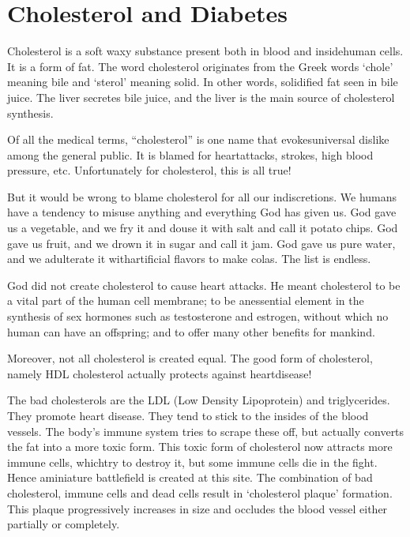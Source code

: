 \chapter{Cholesterol and Diabetes}\label{chap13B}

Cholesterol is a soft waxy substance present both in blood and inside\break human cells. It is a form of fat. The word cholesterol originates from the Greek words ‘chole’ meaning bile and ‘sterol’ meaning solid. In other words, solidified fat seen in bile juice. The liver secretes bile juice, and the liver is the main source of cholesterol synthesis.

Of all the medical terms, “cholesterol” is one name that evokes\break universal dislike among the general public. It is blamed for heart\break attacks, strokes, high blood pressure, etc. Unfortunately for choleste\-rol, this is all true!

But it would be wrong to blame cholesterol for all our indiscretions. We humans have a tendency to misuse anything and everything God has given us. God gave us a vegetable, and we fry it and douse it with salt and call it potato chips. God gave us fruit, and we drown it in sugar and call it jam. God gave us pure water, and we adulterate it with\break artificial flavors to make colas. The list is endless.

God did not create cholesterol to cause heart attacks. He meant cholesterol to be a vital part of the human cell membrane; to be an\break essential element in the synthesis of sex hormones such as testosterone and estrogen, without which no human can have an offspring; and to offer many other benefits for mankind.

Moreover, not all cholesterol is created equal. The good form of cholesterol, namely HDL cholesterol actually protects against heart\break disease!

The bad cholesterols are the LDL (Low Density Lipoprotein) and triglycerides. They promote heart disease. They tend to stick to the insides of the blood vessels. The body’s immune system tries to scrape these off, but actually converts the fat into a more toxic form. This toxic form of cholesterol now attracts more immune cells, which\break try to destroy it, but some immune cells die in the fight. Hence a\break miniature battlefield is created at this site. The combination of bad chole\-sterol, immune cells and dead cells result in ‘cholesterol plaque’ formation. This plaque progressively increases in size and occludes the blood vessel either partially or completely.


